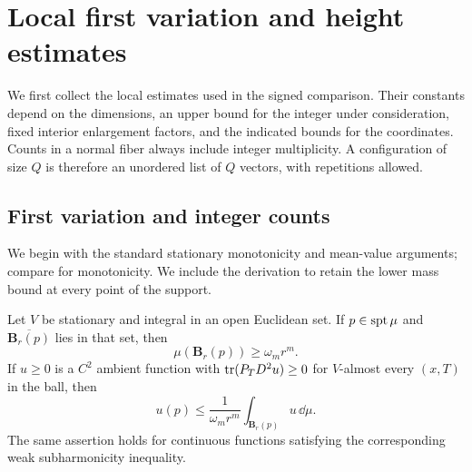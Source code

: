 \section{Local first variation and height estimates}\label{sec:local}

We first collect the local estimates used in the signed comparison.  Their
constants depend on the dimensions, an upper bound for the integer under
consideration, fixed interior enlargement factors, and the indicated bounds
for the coordinates.  Counts in a normal fiber always include integer
multiplicity.  A configuration of size $Q$ is therefore an unordered list of
$Q$ vectors, with repetitions allowed.

\subsection{First variation and integer counts}

We begin with the standard stationary monotonicity and mean-value
arguments; compare \cite[Theorem~9]{Allard1987} for monotonicity.
We include the derivation to retain the lower mass bound at every point
of the support.

\begin{lemma}\label{lt:monotonicity}
Let $V$ be stationary and integral in an open Euclidean set.  If
$p\in\operatorname{spt}\mu$ and $\overline{\mathbf B_r(p)}$ lies in that set, then
\begin{equation}\label{eq:lt-lower-mass}
 \mu(\mathbf B_r(p))\ge\omega_m r^m.
\end{equation}
If $u\ge0$ is a $C^2$ ambient function with
$\operatorname{tr}(P_TD^2u)\ge0$ for $V$-almost every $(x,T)$ in the ball, then
\begin{equation}\label{eq:lt-mean-value}
 u(p)\le \frac{1}{\omega_m r^m}
                  \int_{\mathbf B_r(p)}u\,\dd\mu.
\end{equation}
The same assertion holds for continuous functions satisfying the corresponding
weak subharmonicity inequality.
\end{lemma}

